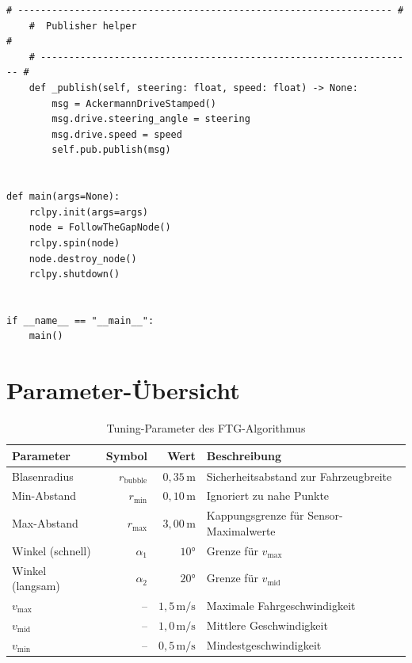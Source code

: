 \begin{lstlisting}[language=Python3,
                   caption={FTG-Hauptknoten (vereinfacht)},
                   label={lst:ftg_node}]
    # ------------------------------------------------------------------ #
    #  Publisher helper                                                    #
    # ------------------------------------------------------------------ #
    def _publish(self, steering: float, speed: float) -> None:
        msg = AckermannDriveStamped()
        msg.drive.steering_angle = steering
        msg.drive.speed = speed
        self.pub.publish(msg)


def main(args=None):
    rclpy.init(args=args)
    node = FollowTheGapNode()
    rclpy.spin(node)
    node.destroy_node()
    rclpy.shutdown()


if __name__ == "__main__":
    main()
\end{lstlisting}

\section{Parameter-Übersicht}
\label{sec:params}

\begin{table}[H]
  \centering
  \caption{Tuning-Parameter des FTG-Algorithmus}
  \label{tab:parameter}
  \begin{tabular}{@{}lrrl@{}}
    \toprule
    \textbf{Parameter}        & \textbf{Symbol}
      & \textbf{Wert}         & \textbf{Beschreibung} \\
    \midrule
    Blasenradius    & $r_{\text{bubble}}$ & $0{,}35\,\text{m}$
      & Sicherheitsabstand zur Fahrzeugbreite \\
    Min-Abstand     & $r_{\min}$          & $0{,}10\,\text{m}$
      & Ignoriert zu nahe Punkte \\
    Max-Abstand     & $r_{\max}$          & $3{,}00\,\text{m}$
      & Kappungsgrenze für Sensor-Maximalwerte \\
    Winkel (schnell)& $\alpha_1$          & $10°$
      & Grenze für $v_{\max}$ \\
    Winkel (langsam)& $\alpha_2$          & $20°$
      & Grenze für $v_{\text{mid}}$ \\
    $v_{\max}$      & –                   & $1{,}5\,\text{m/s}$
      & Maximale Fahrgeschwindigkeit \\
    $v_{\text{mid}}$& –                   & $1{,}0\,\text{m/s}$
      & Mittlere Geschwindigkeit \\
    $v_{\min}$      & –                   & $0{,}5\,\text{m/s}$
      & Mindestgeschwindigkeit \\
    \bottomrule
  \end{tabular}
\end{table}


